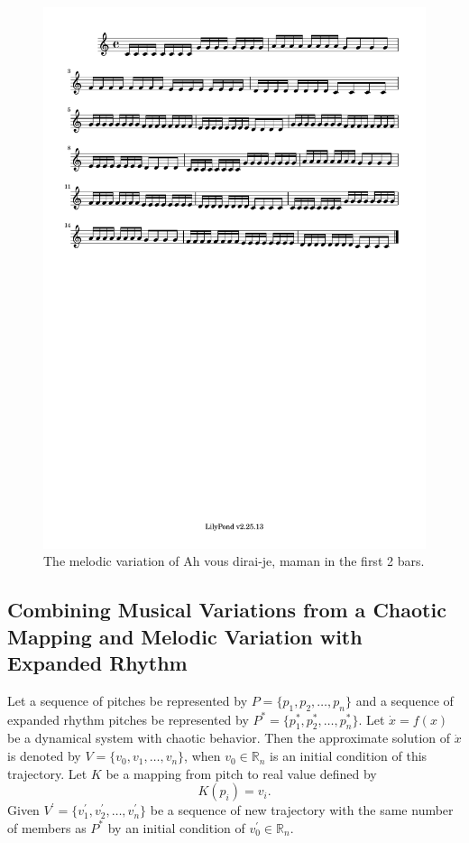 \documentclass[11pt]{article}
\begin{document}
\begin{figure}
\centering
\includegraphics[trim=1cm 26.5cm 1cm 0.5cm, clip, scale=0.6]{melody_variation.pdf}
\caption{The melodic variation of Ah vous dirai-je, maman in the first 2 bars.}
\label{fig:MV2}
\end{figure}

\subsection{Combining Musical Variations from a Chaotic Mapping and Melodic Variation with Expanded Rhythm}
Let a sequence of pitches be represented by $P = \{p_1, p_2, \dots, p_n\}$ and a sequence of expanded rhythm pitches be represented by $P^* = \{p^*_1, p^*_2, \dots, p^*_n\}$. Let $\dot{x} = f(x)$ be a dynamical system with chaotic behavior. Then the approximate solution of $\dot{x}$ is denoted by $V = \{v_0, v_1, \dots, v_n\}$, when $v_0 \in \mathbb{R}_n$ is an initial condition of this trajectory. Let $K$ be a mapping from pitch to real value defined by 
$$K(p_i) = v_i.$$ 
Given $V^\prime = \{ v^\prime_1, v^\prime_2, \dots, v^\prime_n \}$ be a sequence of new trajectory with the same number of members as $P^*$ by an initial condition of $v^\prime_0 \in \mathbb{R}_n$.
\end{document}
